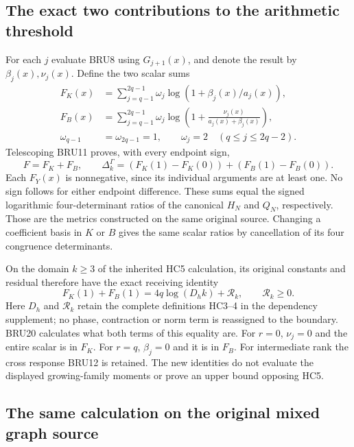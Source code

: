 \subsection{The exact two contributions to the arithmetic threshold}

For each $j$ evaluate BRU8 using $G_{j+1}(x)$, and denote the
result by $\beta_j(x),\nu_j(x)$. Define the two scalar sums
\[
 \begin{aligned}
 F_K(x)&=\sum_{j=q-1}^{2q-1}\omega_j
                \log(1+\beta_j(x)/a_j(x)),\\
 F_B(x)&=\sum_{j=q-1}^{2q-1}\omega_j
                \log\left(1+\frac{\nu_j(x)}{a_j(x)+\beta_j(x)}\right),\\
 \omega_{q-1}&=\omega_{2q-1}=1,\qquad
 \omega_j=2\quad(q\leq j\leq2q-2).
 \end{aligned}\tag{BRU20}
\]
Telescoping BRU11 proves, with every endpoint sign,
\[
 \boxed{F=F_K+F_B,\qquad
 \Delta_k^\Gamma=(F_K(1)-F_K(0))+(F_B(1)-F_B(0)).}
 \tag{BRU21}
\]
Each $F_Y(x)$ is nonnegative, since its individual arguments are
at least one. No sign follows for either endpoint difference.
These sums equal the signed logarithmic four-determinant ratios of
the canonical $H_N$ and $Q_N$, respectively. Those are the metrics
constructed on the same original source.
Changing a coefficient basis in $K$ or $B$ gives the same scalar
ratios by cancellation of its four congruence determinants.

On the domain $k\geq3$ of the inherited HC5 calculation, its original
constants and residual therefore have the exact receiving identity
\[
 F_K(1)+F_B(1)=4q\log(D_hk)+\mathcal R_k,
 \qquad\mathcal R_k\geq0.
 \tag{BRU22}
\]
Here $D_h$ and $\mathcal R_k$ retain the complete definitions HC3--4
in the dependency supplement; no phase, contraction or norm term
is reassigned to the boundary. BRU20 calculates what both terms
of this equality are. For $r=0$, $\nu_j=0$ and the entire scalar
is in $F_K$. For $r=q$, $\beta_j=0$ and it is in $F_B$.
For intermediate rank the cross response BRU12 is retained.
The new identities do not evaluate the displayed growing-family
moments or prove an upper bound opposing HC5.

\subsection{The same calculation on the original mixed graph source}

